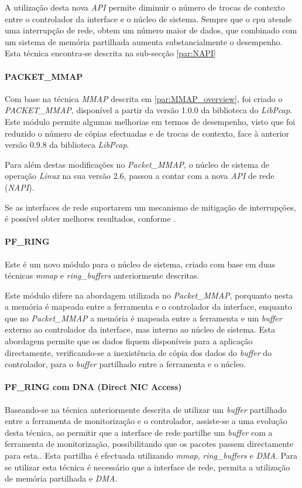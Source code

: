 A utilização desta nova \textit{API} permite diminuir o número de trocas de contexto entre o controlador da interface e o núcleo de sistema.
Sempre que o cpu atende uma interrupção de rede, obtem um número maior de dados, que combinado com um sistema de memória partilhada aumenta substancialmente o desempenho.
Esta técnica encontra-se descrita na sub-secção \ref{par:NAPI}

\paragraph*{PACKET\_MMAP}

Com base na técnica \textit{MMAP} descrita em \ref{par:MMAP_overview}, foi criado o \textit{PACKET\_MMAP}, disponível a partir da versão 1.0.0 da biblioteca do \textit{LibPcap}.
Este módulo permite algumas melhorias em termos de desempenho, visto que foi reduzido o número de cópias efectuadas e de trocas de contexto, face à anterior versão 0.9.8 da biblioteca \textit{LibPcap}.

Para além destas modificações no \textit{Packet\_MMAP}, o núcleo de sistema de operação \textit{Linux} na sua versão 2.6, passou a contar com a nova \textit{API} de rede (\textit{NAPI}).

Se as interfaces de rede suportarem um mecanismo de mitigação de interrupções, é possível obter melhores resultados, conforme \cite{Deri2004}.

\paragraph*{PF\_RING}

Este é um novo módulo para o núcleo de sistema, criado com base em duas técnicas \textit{mmap} e \textit{ring\_buffers} anteriormente descritas.

Este módulo difere na abordagem utilizada no \textit{Packet\_MMAP}, porquanto nesta a memória é mapeada entre a ferramenta e o controlador da interface, enquanto que no \textit{Packet\_MMAP} a memória é mapeada entre a ferramenta e um \textit{buffer} externo ao controlador da interface, mas interno ao núcleo de sistema.
Esta abordagem permite que os dados fiquem disponíveis para a aplicação directamente, verificando-se a inexistência de cópia dos dados do \textit{buffer} do controlador, para o \textit{buffer} partilhado entre a ferramenta e o núcleo\cite{:PF_RING}.
 
\paragraph*{PF\_RING com DNA (Direct NIC Access)}
Baseando-se na técnica anteriormente descrita de utilizar um \textit{buffer} partilhado entre a ferramenta de monitorização e o controlador, assiste-se a uma evolução desta técnica, ao permitir que a interface de rede partilhe um \textit{buffer} com a ferramenta de monitorização, possibilitando que os pacotes passem directamente para esta.\cite{:IntroPF_RIDNADirecNICAcces}.
Esta partilha é efectuada utilizando \textit{mmap}, \textit{ring\_buffers} e \textit{DMA}.
Para se utilizar esta técnica é necessário que a interface de rede, permita a utilização de memória partilhada e \textit{DMA}.

